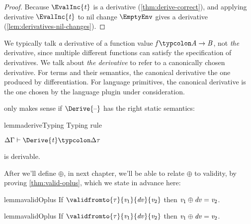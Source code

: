 \begin{proof}
  Because \ensuremath{\EvalInc{\Varid{t}}} is a derivative (\cref{thm:derive-correct}), and applying
  derivative \ensuremath{\EvalInc{\Varid{t}}} to nil change \ensuremath{\EmptyEnv} gives a derivative
  (\cref{lem:derivatives-nil-changes}).
\end{proof}
\begin{remark}
  We typically talk \emph{a} derivative of a function value \ensuremath{\Varid{f}\typcolon\Conid{A}\to \Conid{B}}, not
  \emph{the} derivative, since multiple different functions can satisfy the
  specification of derivatives. We talk about \emph{the derivative} to refer to
  a canonically chosen derivative. For terms and their semantics, the canonical
  derivative the one produced by differentiation. For language primitives, the
  canonical derivative is the one chosen by the language plugin under
  consideration.
\end{remark}

 only makes sense if \ensuremath{\Derive{\text{\textendash}}} has the right
static semantics:

\begin{restatable}{lemma}{deriveTyping}
  \label{lem:derive-typing}
  Typing rule
  \begin{typing}
    {\ensuremath{\Delta \Gamma\vdash\Derive{\Varid{t}}\typcolon\Delta \tau}}
  \end{typing}
  is derivable.
\end{restatable}

After we'll define \ensuremath{\oplus }, in next chapter, we'll be able to relate \ensuremath{\oplus }
to validity, by proving \cref{thm:valid-oplus}, which we state in advance here:
\begin{fullCompile}
\begin{restatable*}{lemma}{validOplus}
  \label{thm:valid-oplus}
  If \ensuremath{\validfromto{\tau}{\Varid{v}_{1}}{\Varid{dv}}{\Varid{v}_{2}}} then \ensuremath{\Varid{v}_{1}\oplus \Varid{dv}\mathrel{=}\Varid{v}_{2}}.
\end{restatable*}
\end{fullCompile}
\begin{partCompile}
\begin{restatable}{lemma}{validOplus}
  \label{thm:valid-oplus}
  If \ensuremath{\validfromto{\tau}{\Varid{v}_{1}}{\Varid{dv}}{\Varid{v}_{2}}} then \ensuremath{\Varid{v}_{1}\oplus \Varid{dv}\mathrel{=}\Varid{v}_{2}}.
\end{restatable}
\end{partCompile}


